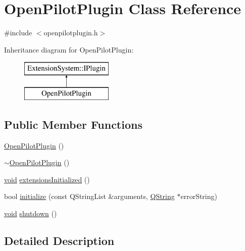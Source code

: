 \hypertarget{class_open_pilot_plugin}{\section{\-Open\-Pilot\-Plugin \-Class \-Reference}
\label{class_open_pilot_plugin}
}


{\ttfamily \#include $<$openpilotplugin.\-h$>$}

\-Inheritance diagram for \-Open\-Pilot\-Plugin\-:\begin{figure}[H]
\begin{center}
\leavevmode
\includegraphics[height=2.000000cm]{class_open_pilot_plugin}
\end{center}
\end{figure}
\subsection*{\-Public \-Member \-Functions}
\begin{DoxyCompactItemize}
\item 
\hyperlink{group___boards___open_pilot_plugin_ga3f890f5e776f6d5a0f6f23dd2d4976c9}{\-Open\-Pilot\-Plugin} ()
\item 
\hyperlink{group___boards___open_pilot_plugin_gaa7eeef25853bb55d85427e94ceff9fa2}{$\sim$\-Open\-Pilot\-Plugin} ()
\item 
\hyperlink{group___u_a_v_objects_plugin_ga444cf2ff3f0ecbe028adce838d373f5c}{void} \hyperlink{group___boards___open_pilot_plugin_gab3fcd8373403dc09fc4d868fdb8f5d23}{extensions\-Initialized} ()
\item 
bool \hyperlink{group___boards___open_pilot_plugin_ga542bd2673508b0755f349632da3bd145}{initialize} (const \-Q\-String\-List \&arguments, \hyperlink{group___u_a_v_objects_plugin_gab9d252f49c333c94a72f97ce3105a32d}{\-Q\-String} $\ast$error\-String)
\item 
\hyperlink{group___u_a_v_objects_plugin_ga444cf2ff3f0ecbe028adce838d373f5c}{void} \hyperlink{group___boards___open_pilot_plugin_gab41fd915d672acefc699cd2185ac1037}{shutdown} ()
\end{DoxyCompactItemize}


\subsection{\-Detailed \-Description}


